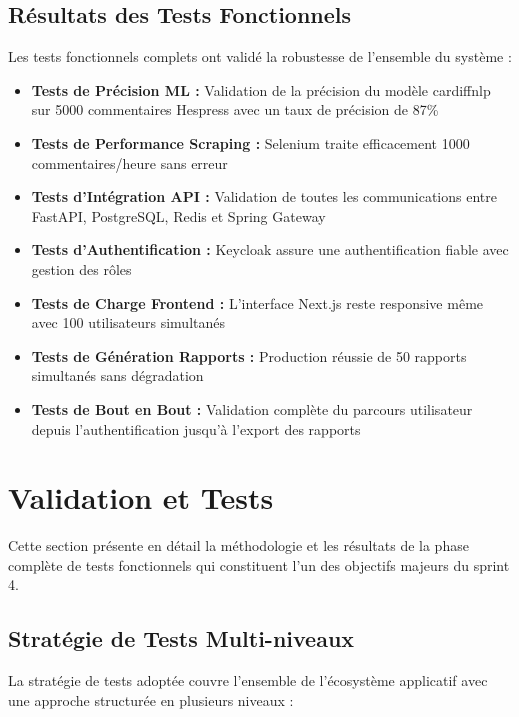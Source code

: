 \subsection{Résultats des Tests Fonctionnels}

Les tests fonctionnels complets ont validé la robustesse de l'ensemble du système :

\begin{itemize}
    \item \textbf{Tests de Précision ML :} Validation de la précision du modèle cardiffnlp sur 5000 commentaires Hespress avec un taux de précision de 87\%
    \item \textbf{Tests de Performance Scraping :} Selenium traite efficacement 1000 commentaires/heure sans erreur
    \item \textbf{Tests d'Intégration API :} Validation de toutes les communications entre FastAPI, PostgreSQL, Redis et Spring Gateway
    \item \textbf{Tests d'Authentification :} Keycloak assure une authentification fiable avec gestion des rôles
    \item \textbf{Tests de Charge Frontend :} L'interface Next.js reste responsive même avec 100 utilisateurs simultanés
    \item \textbf{Tests de Génération Rapports :} Production réussie de 50 rapports simultanés sans dégradation
    \item \textbf{Tests de Bout en Bout :} Validation complète du parcours utilisateur depuis l'authentification jusqu'à l'export des rapports
\end{itemize}

\section{Validation et Tests}

Cette section présente en détail la méthodologie et les résultats de la phase complète de tests fonctionnels qui constituent l'un des objectifs majeurs du sprint 4.

\subsection{Stratégie de Tests Multi-niveaux}

La stratégie de tests adoptée couvre l'ensemble de l'écosystème applicatif avec une approche structurée en plusieurs niveaux :


